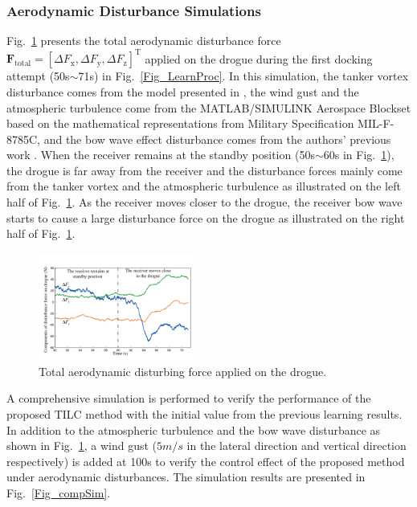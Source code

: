 \subsubsection{Aerodynamic Disturbance Simulations}

Fig.~\ref{Fig_totalAeroDisOnDro} presents the total aerodynamic
disturbance force $\mathbf{F}_{\text{total}}=\left[\Delta F_{\text{x}},\Delta F_{\text{y}},\Delta F_{\text{z}}\right]^{\text{T}}$
applied on the drogue during the first docking attempt (50s$\sim$71s)
in Fig.\ \ref{Fig_LearnProc}. In this simulation, the tanker vortex
disturbance comes from the model presented in \cite{Vortex-1}, the
wind gust and the atmospheric turbulence come from the MATLAB/SIMULINK
Aerospace Blockset based on the mathematical representations from
Military Specification MIL-F-8785C, and the bow wave effect disturbance
comes from the authors' previous work \cite{wei2016drogue}. When
the receiver remains at the standby position (50s$\sim$60s in Fig.~\ref{Fig_totalAeroDisOnDro}),
the drogue is far away from the receiver and the disturbance forces
mainly come from the tanker vortex and the atmospheric turbulence
as illustrated on the left half of Fig.~\ref{Fig_totalAeroDisOnDro}.
As the receiver moves closer to the drogue, the receiver bow wave
starts to cause a large disturbance force on the drogue as illustrated
on the right half of Fig.~\ref{Fig_totalAeroDisOnDro}.

\begin{figure}[tbh]
	\centering \includegraphics[width=0.45\textwidth]{Figures/Figs_Ch9/TotalWindEffect}
	\caption{Total aerodynamic disturbing force applied on the drogue.}
	\label{Fig_totalAeroDisOnDro} 
\end{figure}

A comprehensive simulation is performed to verify the performance
of the proposed TILC method with the initial value from the previous
learning results. In addition to the atmospheric turbulence and the
bow wave disturbance as shown in Fig.~\ref{Fig_totalAeroDisOnDro},
a wind gust ($5m/s$ in the lateral direction and vertical direction
respectively) is added at 100s to verify the control effect of the
proposed method under aerodynamic disturbances. The simulation results
are presented in Fig.~\ref{Fig_compSim}.

